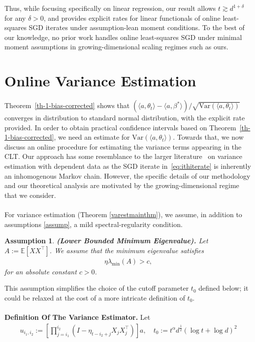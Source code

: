 \documentclass[11pt, reqno,english]{amsart}
\newtheorem{assumption}{Assumption}[section]
\begin{document}
Thus, while focusing specifically on linear regression, our result allows $t \gtrsim d^{1+\delta}$ for any $\delta > 0$, and provides explicit rates for linear functionals of online least-squares SGD iterates under assumption-lean moment conditions. To the best of our knowledge, no prior work handles online least-squares SGD under minimal moment assumptions in growing-dimensional scaling regimes such as ours.

\section{Online Variance Estimation}\label{sec:varest}
Theorem~\ref{th-1-bias-corrected} shows that $(\langle a,\theta_t \rangle - \langle a, \beta^* \rangle)/ \sqrt{\mathrm{Var}(\langle a,\theta_t \rangle)}$ converges in distribution to standard normal distribution, with the explicit rate provided. In order to obtain practical confidence intervals based on Theorem~\ref{th-1-bias-corrected}, we need an estimate for  $\mathrm{Var}(\langle a,\theta_t \rangle)$. Towards that, we now discuss an online procedure for estimating the variance terms appearing in the CLT. Our approach has some resemblance to the larger literature~\cite{politis1999subsampling,lahiri2013resampling} on variance estimation with dependent data as the SGD iterate in~\eqref{eq:ithiterate} is inherently an inhomogenous Markov chain. However, the specific details of our methodology and our theoretical analysis are motivated by the growing-dimensional regime that we consider. 
\\\\
For variance estimation (Theorem \ref{varestmainthm}), we assume, in addition to assumptions \ref{assump}, a mild spectral-regularity condition. 
\begin{assumption}\label{assump-varest}
\textbf{(Lower Bounded Minimum Eigenvalue).} Let $A := \mathbb{E}[XX^\top]$. We assume that the minimum eigenvalue satisfies 
\begin{align*}
\eta \lambda_{\min}(A) > c,
\end{align*} 
for an absolute constant $c > 0$. 
\end{assumption}
This assumption simplifies the choice of the cutoff parameter $t_0$ defined below; it could be relaxed at the cost of a more intricate definition of $t_0$.
\\\\
\textbf{Definition  Of The Variance Estimator.}
Let
\begin{align*}
u_{i_1,i_2} := [\prod_{j = i_1}^{i_2}(I - \eta_{t-i_2 + j}X_{j}X^\top_{j})]a, \quad t_0 := t^{\alpha}d^{\frac{1}{2}}(\log t + \log d)^2    
\end{align*}
\end{document}
